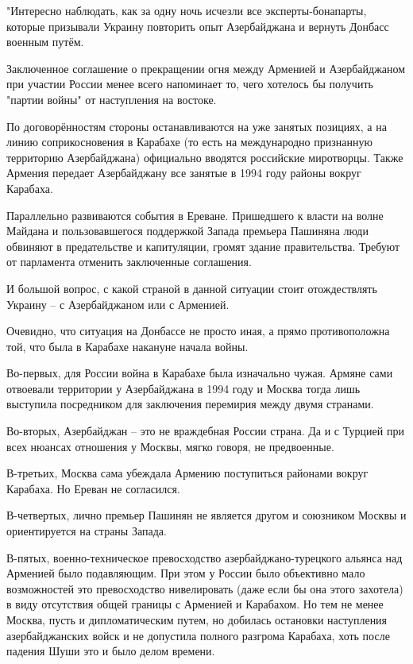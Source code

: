 "Интересно наблюдать, как за одну ночь исчезли все эксперты-бонапарты, которые
призывали Украину повторить опыт Азербайджана и вернуть Донбасс военным путём.

Заключенное соглашение о прекращении огня между Арменией и Азербайджаном при
участии России менее всего напоминает то, чего хотелось бы получить "партии
войны" от наступления на востоке.

По договорённостям стороны останавливаются на уже занятых позициях, а на линию
соприкосновения в Карабахе (то есть на международно признанную территорию
Азербайджана) официально вводятся российские миротворцы. Также Армения передает
Азербайджану все занятые в 1994 году районы вокруг Карабаха.

Параллельно развиваются события в Ереване. Пришедшего к власти на волне Майдана
и пользовавшегося поддержкой Запада премьера Пашиняна люди обвиняют в
предательстве и капитуляции, громят здание правительства. Требуют от парламента
отменить заключенные соглашения.

И большой вопрос, с какой страной в данной ситуации стоит отождествлять Украину
– с Азербайджаном или с Арменией.

Очевидно, что ситуация на Донбассе не просто иная, а прямо противоположна той,
что была в Карабахе накануне начала войны.

Во-первых, для России война в Карабахе была изначально чужая. Армяне сами
отвоевали территории у Азербайджана в 1994 году и Москва тогда лишь выступила
посредником для заключения перемирия между двумя странами.

Во-вторых, Азербайджан – это не враждебная России страна. Да и с Турцией при
всех нюансах отношения у Москвы, мягко говоря, не предвоенные.

В-третьих, Москва сама убеждала Армению поступиться районами вокруг Карабаха.
Но Ереван не согласился.

В-четвертых, лично премьер Пашинян не является другом и союзником Москвы и
ориентируется на страны Запада.

В-пятых, военно-техническое превосходство азербайджано-турецкого альянса над
Арменией было подавляющим. При этом у России было объективно мало возможностей
это превосходство нивелировать (даже если бы она этого захотела) в виду
отсутствия общей границы с Арменией и Карабахом. Но тем не менее Москва, пусть
и дипломатическим путем, но добилась остановки наступления азербайджанских
войск и не допустила полного разгрома Карабаха, хоть после падения Шуши это и
было делом времени.

